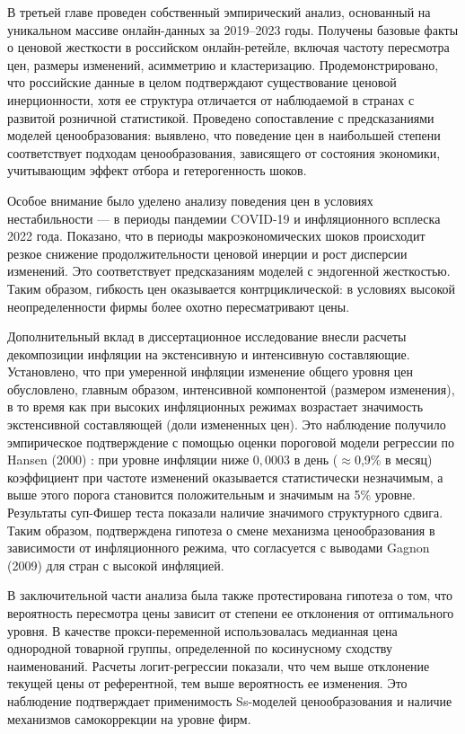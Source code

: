 В третьей главе проведен собственный эмпирический анализ, основанный на уникальном массиве онлайн-данных за 2019–2023 годы. Получены базовые факты о ценовой жесткости в российском онлайн-ретейле, включая частоту пересмотра цен, размеры изменений, асимметрию и кластеризацию. Продемонстрировано, что российские данные в целом подтверждают существование ценовой инерционности, хотя ее структура отличается от наблюдаемой в странах с развитой розничной статистикой. Проведено сопоставление с предсказаниями моделей ценообразования: выявлено, что поведение цен в наибольшей степени соответствует подходам ценообразования, зависящего от состояния экономики, учитывающим эффект отбора и гетерогенность шоков.

Особое внимание было уделено анализу поведения цен в условиях нестабильности — в периоды пандемии COVID-19 и инфляционного всплеска 2022 года. Показано, что в периоды макроэкономических шоков происходит резкое снижение продолжительности ценовой инерции и рост дисперсии изменений. Это соответствует предсказаниям моделей с эндогенной жесткостью. Таким образом, гибкость цен оказывается контрциклической: в условиях высокой неопределенности фирмы более охотно пересматривают цены.

Дополнительный вклад в диссертационное исследование внесли расчеты декомпозиции инфляции на экстенсивную и интенсивную составляющие. Установлено, что при умеренной инфляции изменение общего уровня цен обусловлено, главным образом, интенсивной компонентой (размером изменения), в то время как при высоких инфляционных режимах возрастает значимость экстенсивной составляющей (доли измененных цен). Это наблюдение получило эмпирическое подтверждение с помощью оценки пороговой модели регрессии по Hansen (2000) \cite{hansen2000}: при уровне инфляции ниже $0,0003$ в день ($\approx$0,9\% в месяц) коэффициент при частоте изменений оказывается статистически незначимым, а выше этого порога становится положительным и значимым на 5\% уровне. Результаты суп-Фишер теста показали наличие значимого структурного сдвига. Таким образом, подтверждена гипотеза о смене механизма ценообразования в зависимости от инфляционного режима, что согласуется с выводами Gagnon (2009) для стран с высокой инфляцией.

В заключительной части анализа была также протестирована гипотеза о том, что вероятность пересмотра цены зависит от степени ее отклонения от оптимального уровня. В качестве прокси-переменной использовалась медианная цена однородной товарной группы, определенной по косинусному сходству наименований. Расчеты логит-регрессии показали, что чем выше отклонение текущей цены от референтной, тем выше вероятность ее изменения. Это наблюдение подтверждает применимость Ss-моделей ценообразования и наличие механизмов самокоррекции на уровне фирм.

